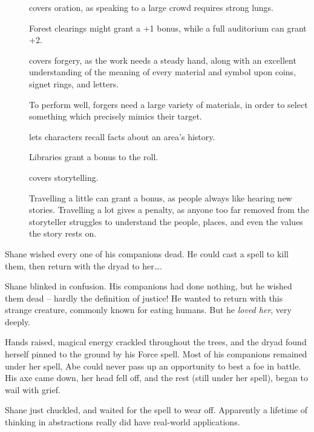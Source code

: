 \begin{multicols}{2}
{}

\begin{description}
  \item[]
    covers oration, as speaking to a large crowd requires strong lungs.

    Forest clearings might grant a +1 bonus, while a full auditorium can grant +2.
  \item[]
    covers forgery, as the work needs a steady hand, along with an excellent understanding of the meaning of every material and symbol upon coins, signet rings, and letters.

    To perform well, forgers need a large variety of materials, in order to select something which precisely mimics their target.
  \item[]
    lets characters recall facts about an area's history.

    Libraries grant a bonus to the roll.
  \item[]
    covers storytelling.

    Travelling a little can grant a bonus, as people always like hearing new stories.
    Travelling a lot gives a penalty, as anyone too far removed from the storyteller struggles to understand the people, places, and even the values the story rests on.
\end{description}

\begin{exampletext}

  Shane wished every one of his companions dead.
  He could cast a spell to kill them, then return with the dryad to her\ldots.

  Shane blinked in confusion. 
  His companions had done nothing, but he wished them dead -- hardly the definition of justice!
  He wanted to return with this strange creature, commonly known for eating humans.
  But he \emph{loved her}, very deeply.

  Hands raised, magical energy crackled throughout the trees, and the dryad found herself pinned to the ground by his Force spell.
  Most of his companions remained under her spell, Abe could never pass up an opportunity to best a foe in battle.
  His axe came down, her head fell off, and the rest (still under her spell), began to wail with grief.

  Shane just chuckled, and waited for the spell to wear off.
  Apparently a lifetime of thinking in abstractions really did have real-world applications.


\end{exampletext}
\end{multicols}
